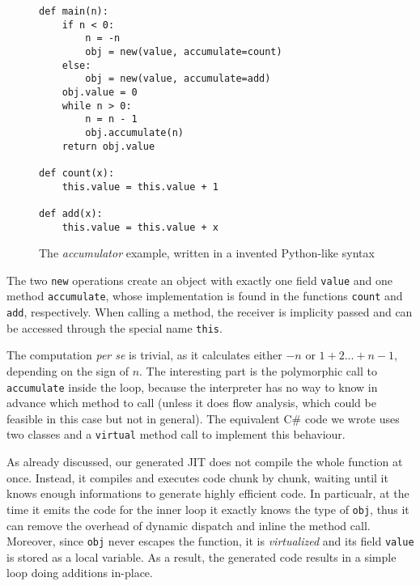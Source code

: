 \begin{figure}[h]
\begin{center}
\begin{lstlisting}
def main(n):
    if n < 0:
        n = -n
        obj = new(value, accumulate=count)
    else:
        obj = new(value, accumulate=add)
    obj.value = 0
    while n > 0:
        n = n - 1
        obj.accumulate(n)
    return obj.value

def count(x):
    this.value = this.value + 1

def add(x):
    this.value = this.value + x
\end{lstlisting}
\caption{The \emph{accumulator} example, written in a invented Python-like syntax}
\label{fig:accumulator}
\end{center}
\end{figure}

The two \lstinline{new} operations create an object with exactly one field
\lstinline{value} and one method \lstinline{accumulate}, whose implementation
is found in the functions \lstinline{count} and \lstinline{add}, respectively.
When calling a method, the receiver is implicity passed and can be accessed
through the special name \lstinline{this}.

The computation \emph{per se} is trivial, as it calculates either $-n$ or
$1+2...+n-1$, depending on the sign of $n$. The interesting part is the
polymorphic call to \lstinline{accumulate} inside the loop, because the interpreter has
no way to know in advance which method to call (unless it does flow analysis,
which could be feasible in this case but not in general).  The equivalent C\#
code we wrote uses two classes and a \lstinline{virtual} method call to
implement this behaviour.

As already discussed, our generated JIT does not compile the whole function at
once. Instead, it compiles and executes code chunk by chunk, waiting until it
knows enough informations to generate highly efficient code.  In particualr,
at the time it emits the code for the inner loop it exactly knows the
type of \lstinline{obj}, thus it can remove the overhead of dynamic dispatch
and inline the method call.  Moreover, since \lstinline{obj} never escapes the
function, it is \emph{virtualized} and its field \lstinline{value} is stored
as a local variable.  As a result, the generated code results in a simple loop
doing additions in-place.

